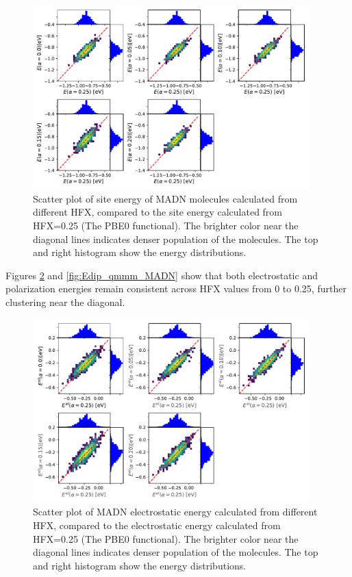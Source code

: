 \documentclass[letterpaper,12pt]{article}
\begin{document}
\begin{figure}[H]
    \centering
    \includegraphics[width=0.95\textwidth]{figs/MADN_HFX/scatterE_qmmm.pdf}
    \caption{Scatter plot of site energy of MADN molecules calculated from different HFX, compared to the site energy calculated from HFX=0.25 (The PBE0 functional). The brighter color near the diagonal lines indicates denser population of the molecules.  The top and right histogram show the energy distributions.}
    \label{fig:E_qmmm_MADN}
\end{figure}


Figures \ref{fig:Estat_qmmm_MADN} and \ref{fig:Edip_qmmm_MADN} show that both electrostatic and polarization energies remain consistent across HFX values from 0 to 0.25, further clustering near the diagonal.


\begin{figure}[H]
    \centering
    \includegraphics[width=0.95\textwidth]{figs/MADN_HFX/scatterEstat_qmmm.pdf}
    \caption{Scatter plot of MADN electrostatic energy calculated from different HFX, compared to the electrostatic energy calculated from HFX=0.25 (The PBE0 functional). The brighter color near the diagonal lines indicates denser population of the molecules.  The top and right histogram show the energy distributions.}
    \label{fig:Estat_qmmm_MADN}
\end{figure}
\end{document}

